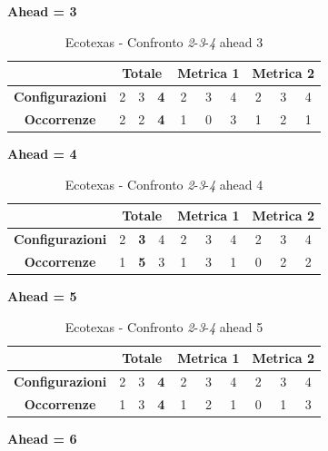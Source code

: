 \documentclass[12pt,a4paper,oneside,openright]{book}
\begin{document}
\medskip
\textbf{Ahead = 3}


\begin{table}[H]
\centering
\begin{tabular}{|c|c|c|c|c|c|c|c|c|c|}
\hline
 & \multicolumn{3}{|c|}{\textbf{Totale}} & \multicolumn{3}{|c|}{\textbf{Metrica 1}} & \multicolumn{3}{|c|}{\textbf{Metrica 2}} \\
\hline
\textbf{Configurazioni} & 2 & 3 & \textbf{4} & 2 & 3 & 4 & 2 & 3 & 4 \\
\hline
\textbf{Occorrenze} & 2 & 2 & \textbf{4} & 1 & 0 & 3 & 1 & 2 & 1 \\
\hline
\end{tabular}
\caption{Ecotexas - Confronto \textit{2}-\textit{3}-\textit{4} ahead 3}
\end{table}

\medskip
\textbf{Ahead = 4}


\begin{table}[H]
\centering
\begin{tabular}{|c|c|c|c|c|c|c|c|c|c|}
\hline
 & \multicolumn{3}{|c|}{\textbf{Totale}} & \multicolumn{3}{|c|}{\textbf{Metrica 1}} & \multicolumn{3}{|c|}{\textbf{Metrica 2}} \\
\hline
\textbf{Configurazioni} & 2 & \textbf{3} & 4 & 2 & 3 & 4 & 2 & 3 & 4 \\
\hline
\textbf{Occorrenze} & 1 & \textbf{5} & 3 & 1 & 3 & 1 & 0 & 2 & 2 \\
\hline
\end{tabular}
\caption{Ecotexas - Confronto \textit{2}-\textit{3}-\textit{4} ahead 4}
\end{table}

\medskip
\textbf{Ahead = 5}


\begin{table}[H]
\centering
\begin{tabular}{|c|c|c|c|c|c|c|c|c|c|}
\hline
 & \multicolumn{3}{|c|}{\textbf{Totale}} & \multicolumn{3}{|c|}{\textbf{Metrica 1}} & \multicolumn{3}{|c|}{\textbf{Metrica 2}} \\
\hline
\textbf{Configurazioni} & 2 & 3 & \textbf{4} & 2 & 3 & 4 & 2 & 3 & 4 \\
\hline
\textbf{Occorrenze} & 1 & 3 & \textbf{4} & 1 & 2 & 1 & 0 & 1 & 3 \\
\hline
\end{tabular}
\caption{Ecotexas - Confronto \textit{2}-\textit{3}-\textit{4} ahead 5}
\end{table}

\medskip
\textbf{Ahead = 6}
\end{document}
